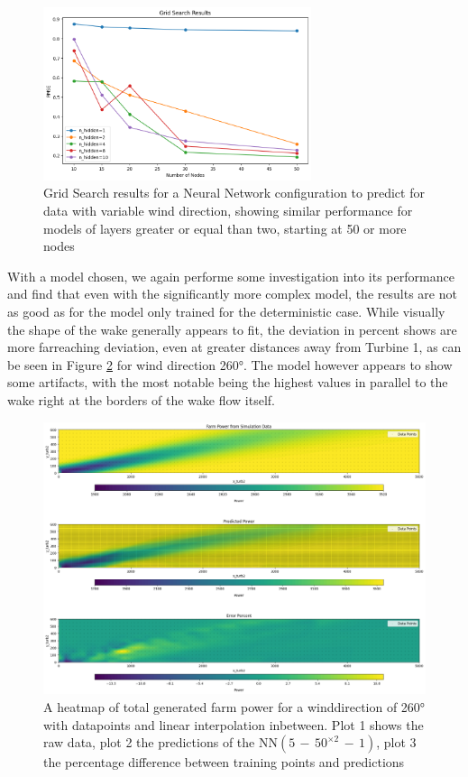 \begin{figure}[h] 
	\centering
	\includegraphics[width=0.7\textwidth]{figures/optimization/prob_nn_opti.png} 
	\caption{Grid Search results for a Neural Network configuration to predict for data with variable wind direction, showing similar performance for models of layers greater or equal than two, starting at 50 or more nodes}
	\label{fig:determ_nn_opti}
\end{figure}


With a model chosen, we again performe some investigation into its performance and find that even with the significantly more complex model, the results are not as good as for the model only trained for the deterministic case. While visually the shape of the wake generally appears to fit, the deviation in percent shows are more farreaching deviation, even at greater distances away from Turbine 1, as can be seen in Figure \ref{fig:prob_model_colormap} for wind direction 260°. The model however appears to show some artifacts, with the most notable being the highest values in parallel to the wake right at the borders of the wake flow itself.

\begin{figure}[h] 
	\centering
	\includegraphics[width=1\textwidth]{figures/optimization/prob_model_colormap.png} 
	\caption{A heatmap of total generated farm power for a winddirection of 260° with datapoints and linear interpolation inbetween. Plot 1 shows the raw data, plot 2 the predictions of the $\text{NN}(5\,{-}\,50^{\times2}\,{-}\,1)$, plot 3 the percentage difference between training points and predictions }
	\label{fig:prob_model_colormap}
\end{figure}


